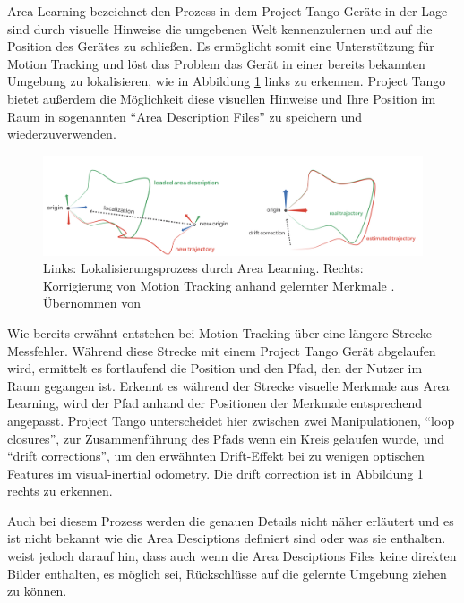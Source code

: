 Area Learning bezeichnet den Prozess in dem Project Tango Geräte in der Lage sind durch visuelle Hinweise die umgebenen Welt kennenzulernen und auf die Position des Gerätes zu schließen. 
Es ermöglicht somit eine Unterstützung für Motion Tracking und löst das Problem das Gerät in einer bereits bekannten Umgebung zu lokalisieren, wie in Abbildung \ref{fig:area-learning} links zu erkennen.
Project Tango bietet außerdem die Möglichkeit diese visuellen Hinweise und Ihre Position im Raum in sogenannten \enquote{Area Description Files} zu speichern und wiederzuverwenden. \citep{GoogleDevelopersConcepts:online}

\begin{figure}[h]
  \centering
	\includegraphics[width=1.0\textwidth]{content/images/theory/tango-area-learning.png} 
  \caption{Links: Lokalisierungsprozess durch Area Learning. Rechts: Korrigierung von Motion Tracking anhand gelernter Merkmale . Übernommen von \citet{GoogleDevelopers:online}}
  \label{fig:area-learning}
\end{figure}

Wie bereits erwähnt entstehen bei Motion Tracking über eine längere Strecke Messfehler. 
Während diese Strecke mit einem Project Tango Gerät abgelaufen wird, ermittelt es fortlaufend die Position und den Pfad, den der Nutzer im Raum gegangen ist. 
Erkennt es während der Strecke visuelle Merkmale aus Area Learning, wird der Pfad anhand der Positionen der Merkmale entsprechend angepasst. 
Project Tango unterscheidet hier zwischen zwei Manipulationen, \enquote{loop closures}, zur Zusammenführung des Pfads wenn ein Kreis gelaufen wurde, und \enquote{drift corrections}, um den erwähnten Drift-Effekt bei zu wenigen optischen Features im visual-inertial odometry. 
Die drift correction ist in Abbildung \ref{fig:area-learning} rechts zu erkennen. \citep{GoogleDevelopersConcepts:online} 

Auch bei diesem Prozess werden die genauen Details nicht näher erläutert und es ist nicht bekannt wie die Area Desciptions definiert sind oder was sie enthalten. \citet{GoogleDevelopersConcepts:online} weist jedoch darauf hin, dass auch wenn die Area Desciptions Files keine direkten Bilder enthalten, es möglich sei, Rückschlüsse auf die gelernte Umgebung ziehen zu können. 

